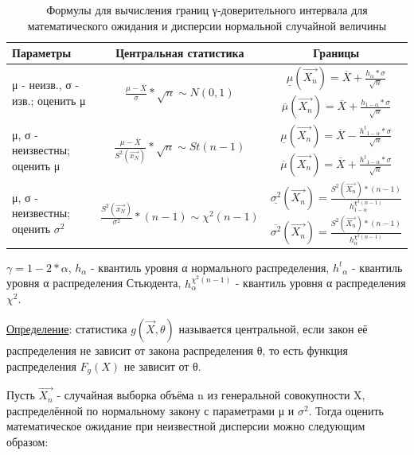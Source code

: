\documentclass[12pt,a4paper]{scrartcl}
\begin{document}
\begin{table}[ht]
	\caption{Формулы для вычисления границ γ-доверительного интервала для математического ожидания и дисперсии нормальной случайной величины}
	\begin{tabular}{|l|c|c|}
		\hline
		Параметры & Центральная статистика & Границы\\
		\hline
		\multirow{2}{*}{μ - неизв., σ - изв.; оценить μ} & \multirow{2}{*}{$\frac {μ - \overline {X}} {σ} * \sqrt{n} \sim N(0,1)$} & $\underline {μ} (\overrightarrow {X_n}) = \overline {X} + \frac {h_α * σ} {\sqrt {n}}$\\
		& & $\overline{μ} (\overrightarrow {X_n}) = \overline {X} + \frac {h_{1-α} * σ} {\sqrt {n}}$\\
		\hline
		\multirow{2}{*}{μ, σ - неизвестны; оценить μ} & \multirow{2}{*}{$\frac {μ - \overline {X}} {S^2(\overrightarrow {x_N})} * \sqrt{n} \sim St(n - 1)$} & $\underline {μ} (\overrightarrow {X_n}) = \overline {X} - \frac {{h^t}_{1-α} * σ} {\sqrt {n}}$\\
		& & $\overline{μ} (\overrightarrow {X_n}) = \overline {X} + \frac {{h^t}_{1-α} * σ} {\sqrt {n}}$\\
		\hline
		\multirow{2}{*}{μ, σ - неизвестны; оценить $σ^2$} & \multirow{2}{*}{$\frac {S^2(\overrightarrow {x_N})} {σ^2} * (n - 1) \sim χ^2(n - 1)$} & $\underline {σ^2} (\overrightarrow {X_n}) = \frac {S^2(\overrightarrow {X_n}) * (n - 1)} {h^{χ^2(n - 1)}_{1-α}}$\\ 
		& & $\overline {σ^2} (\overrightarrow {X_n}) = \frac {S^2(\overrightarrow {X_n}) * (n - 1)} {h^{χ^2(n - 1)}_α}$\\
		\hline
	\end{tabular}
	\label{tab:tabular}
\end{table}

$γ = 1 - 2 * α$, $h_α$ - квантиль уровня α нормального распределения, ${h^t}_α$ - квантиль уровня α распределения Стьюдента, $h^{χ^2(n - 1)}_α$ - квантиль уровня α распределения $χ^2$.

\underline {Определение}: статистика $g(\overrightarrow{X}, θ)$ называется центральной, если закон её распределения не зависит от закона распределения θ, то есть функция распределения $F_g(X)$ не зависит от θ.

Пусть $\overrightarrow {X_n}$ - случайная выборка объёма n из генеральной совокупности X, распределённой по нормальному закону с параметрами μ и ${σ^2}$. Тогда оценить математическое ожидание при неизвестной дисперсии можно следующим образом:
\end{document}
